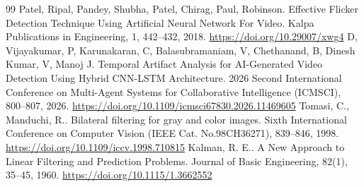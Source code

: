 \documentclass[twocolumn,10pt]{svjour3}
\begin{document}
\begin{thebibliography}{99}
 Patel, Ripal, Pandey, Shubha, Patel, Chirag, Paul, Robinson. Effective Flicker Detection Technique Using Artificial Neural Network For Video. Kalpa Publications in Engineering, 1, 442–432, 2018. \url{https://doi.org/10.29007/xwg4}
 D, Vijayakumar, P, Karunakaran, C, Balasubramaniam, V, Chethanand, B, Dinesh Kumar, V, Manoj J. Temporal Artifact Analysis for AI-Generated Video Detection Using Hybrid CNN-LSTM Architecture. 2026 Second International Conference on Multi-Agent Systems for Collaborative Intelligence (ICMSCI), 800–807, 2026. \url{https://doi.org/10.1109/icmsci67830.2026.11469605}
 Tomasi, C., Manduchi, R.. Bilateral filtering for gray and color images. Sixth International Conference on Computer Vision (IEEE Cat. No.98CH36271), 839–846, 1998. \url{https://doi.org/10.1109/iccv.1998.710815}
 Kalman, R. E.. A New Approach to Linear Filtering and Prediction Problems. Journal of Basic Engineering, 82(1), 35–45, 1960. \url{https://doi.org/10.1115/1.3662552}
\end{thebibliography}
\end{document}

